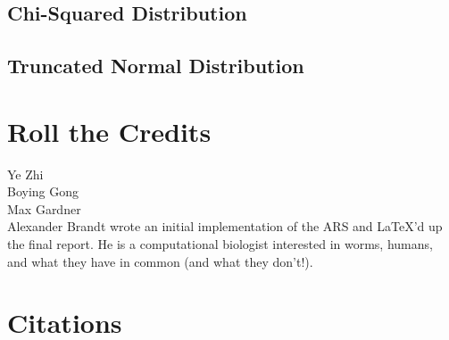 \documentclass[12pt, oneside]{article}
\begin{document}
\subsection{Chi-Squared Distribution}

\subsection{Truncated Normal Distribution}

\section{Roll the Credits}

Ye Zhi \\
Boying Gong \\
Max Gardner \\
Alexander Brandt wrote an initial implementation of the ARS and \LaTeX'd up the final report.  He is a computational biologist interested in worms, humans, and what they have in common (and what they don't!).  \\

\section{Citations}
\end{document}
